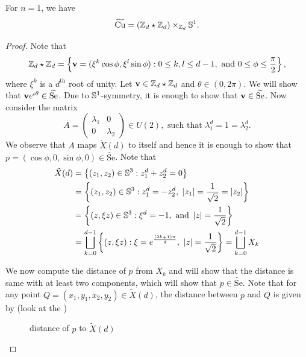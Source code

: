 \begin{thm}\label{thm:cut-locus-for_X1_d}
	For $n=1$, we have 
	\begin{displaymath}
		\widetilde{\mathrm{Cu}} = \left(\mathbb{Z}_d\star\mathbb{Z}_d\right) \times_{\mathbb{Z}_d}\mathbb{S}^1.
	\end{displaymath}
\end{thm}

\begin{proof}
	Note that 
	 \begin{displaymath}
		\mathbb{Z}_d\star\mathbb{Z}_d = \left\{\mathbf{v}=(\xi^k\cos \phi,\xi^l\sin\phi):0\le k,l\le d-1,~\text{and } 0\le \phi\le \frac{\pi}{2}\right\},
	 \end{displaymath}
	 where $\xi^k$ is a $d^\text{th}$ root of unity. Let $\mathbf{v}\in \mathbb{Z}_d\star \mathbb{Z}_d$ and $\theta\in (0,2\pi)$. We will show that $\mathbf{v} e^{\iota \theta}\in \widetilde{\mathrm{Se}}$. Due to $\mathbb{S}^1$-symmetry, it is enough to show that $\mathbf{v}\in \widetilde{\mathrm{Se}}$. Now consider the matrix 
	 \begin{displaymath}
		  A = 
		  \begin{pmatrix}
			\lambda_1 & 0 \\ 0 & \lambda_2	  
		  \end{pmatrix} \in U(2),
		  \text{ such that } \lambda_1^d=1=\lambda_2^d.
	 \end{displaymath}
	 We observe that $A$ maps $\tilde{X}(d)$ to itself and hence it is enough to show that $p=(\cos \phi,0,\sin\phi,0)\in \widetilde{\mathrm{Se}}$. Note that 
	\begin{align*}
		\tilde{X}(d) & = \left\{\left(z_1,z_2\right)\in \mathbb{S}^3: z_1^d+z_2^d=0\right\} \\
			& = \left\{\left(z_1,z_2\right)\in \mathbb{S}^3: z_1^d=-z_2^d,~ \left|z_1\right|=\frac{1}{\sqrt{2}}=\left|z_2\right|\right\} \\ 
			& = \left\{\left(z,\xi z\right)\in \mathbb{S}^3: \xi^d = -1, \text{ and } \left|z\right|=\frac{1}{\sqrt{2}}\right\} \\
			& = \bigsqcup_{k=0}^{d-1}\left\{(z,\xi z): \xi = e^{\frac{(2k+1)\pi}{d}},~|z|=\frac{1}{\sqrt{2}} \right\} = \bigsqcup_{k=0}^{d-1}X_k
	\end{align*}
	 
	\noindent We now compute the distance of $p$ from $X_k$ and will show that the distance is same with at least two components, which will show that $p\in \widetilde{\mathrm{Se}}$. Note that for any point $Q=(x_1,y_1,x_2,y_2)\in \tilde{X}(d)$, the distance between $p$ and $Q$ is given by (look at the )
	\begin{figure}[!htb]
		\centering
		\caption{distance of $p$ to $\tilde{X}(d)$ \label{fig:distance_p_to_Xd}}
	\end{figure}
	

\end{proof}
